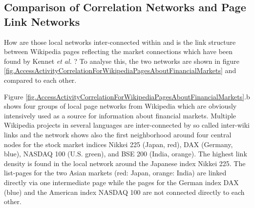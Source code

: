 \documentclass[a4paper,10pt]{scrbook}
\begin{document}
\subsection{Comparison of Correlation Networks and Page Link Networks}

How are those local networks inter-connected within and is the link structure between Wikipedia pages reflecting the market connections which have been found by Kennet \textit{et al.} \cite{Kenett2012}? To analyse this, the two networks are shown in figure \ref{fig.AccessActivityCorrelationForWikipediaPagesAboutFinancialMarkets} and compared to each other. 

%
%
%

\label{ext.fig.AccessActivityCorrelationForWikipediaPagesAboutFinancialMarkets}


Figure \ref{fig.AccessActivityCorrelationForWikipediaPagesAboutFinancialMarkets}.b shows four groups of local page networks from Wikipedia which are obviously intensively used as a source for information about financial markets. Multiple Wikipedia projects in several languages are inter-connected by so called inter-wiki links and the network shows also the first neighborhood around four central nodes for the stock market indices Nikkei 225 (Japan, red), DAX (Germany, blue), NASDAQ 100 (U.S. green), and BSE 200 (India, orange).
The highest link density is found in the local network around the Japanese index Nikkei 225. The list-pages for the two Asian markets (red: Japan, orange: India) are linked directly via one intermediate page while the pages for the German index DAX (blue) and the American index NASDAQ 100 are not connected directly to each other. 
 
\clearpage
\end{document}
